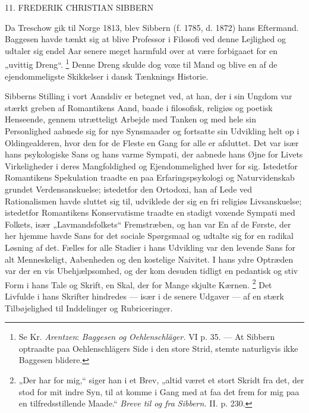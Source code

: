 \documentclass[12pt,a4paper,openany]{book}
\newcommand{\opage}[1]{\marginnote{\footnotesize\textit{[#1]}}}
\begin{document}
\begin{center}\large 11. FREDERIK CHRISTIAN SIBBERN\end{center}

Da Treschow gik til Norge 1813, blev Sibbern (f. 1785, d. 1872) hans Eftermand.
Baggesen havde tænkt sig at blive Professor i Filosofi ved denne Lejlighed og
udtaler sig endel Aar senere meget harmfuld over at være forbigaaet for en
„uvittig Dreng“.%
\footnote[1]{Se Kr. \emph{Arentzen}: \textit{Baggesen og Oehlenschläger.} VI p.
35. --- At Sibbern optraadte paa Oehlenschlägers Side i den store Strid, stemte
naturligvis ikke Baggesen blidere.} Denne Dreng skulde dog voxe til Mand og
blive en af de ejendommeligste Skikkelser i dansk Tænknings Historie.

Sibberns Stilling i vort Aandsliv er betegnet ved, at han, der i sin Ungdom var
stærkt greben af Romantikens Aand, baade i filosofisk, religiøs og poetisk
Henseende, gennem utrætteligt Arbejde med Tanken og med hele sin Personlighed
aabnede sig for nye Synsmaader og fortsatte sin Udvikling helt op i
Oldingealderen, hvor den for de Fleste en Gang for alle er afsluttet. Det var
især hans psykologiske Sans og hans varme Sympati, der aabnede hans Øjne for
Livets Virkeligheder i deres Mangfoldighed og Ejendommelighed hver for sig.
Istedetfor Romantikens Spekulation traadte en paa Erfaringspsykologi og
Naturvidenskab grundet Verdensanskuelse; istedetfor den Ortodoxi, han af Lede
ved Rationalismen havde sluttet sig til, udviklede der sig en fri religiøs
Livsanskuelse; istedetfor Romantikens Konservatisme traadte en stadigt voxende
Sympati med Folkets, især „Lavmandsfolkets“ Fremstræben, og han var En af de
Første, der her
\setcounter{footnote}{0}%
\opage{98}hjemme havde Sans for det sociale Spørgsmaal og udtalte sig for en
radikal Løsning af det. Fælles for alle Stadier i hans Udvikling var den
levende Sans for alt Menneskeligt, Aabenheden og den kostelige Naivitet. I hans
ydre Optræden var der en vis Ubehjælpsomhed, og der kom desuden tidligt en
pedantisk og stiv Form i hans Tale og Skrift, en Skal, der for Mange skjulte Kærnen.%
\footnote[1]{„Der har for mig,“ siger han i et Brev, „altid været et stort
Skridt fra det, der stod for mit indre Syn, til at komme i Gang med at faa det
frem for mig paa en tilfredsstillende Maade.“ \textit{Breve til og fra
Sibbern.} II. p. 230.} Det Livfulde i hans Skrifter hindredes --- især i de
senere Udgaver --- af en stærk Tilbøjelighed til Inddelinger og Rubriceringer.
\end{document}
